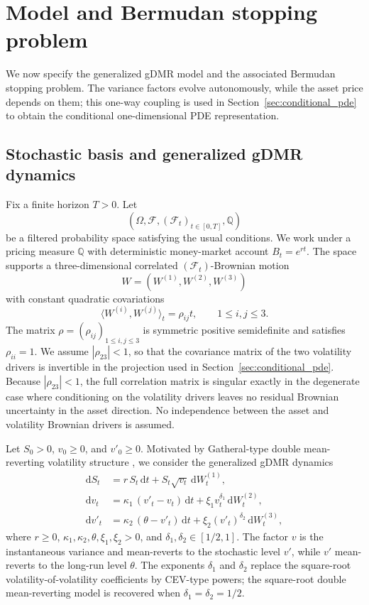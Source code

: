 \documentclass[pdflatex,sn-mathphys-num]{sn-jnl}
\theoremstyle{thmstyleone}%
\theoremstyle{thmstylethree}%
\theoremstyle{thmstyletwo}%
\newcommand{\dd}{\mathrm d}
\newcommand{\Q}{\mathbb Q}
\newcommand{\F}{\mathcal F}
\begin{document}
\section{Model and Bermudan stopping problem}\label{sec:model}

We now specify the generalized gDMR model and the associated Bermudan stopping
problem. The variance factors evolve autonomously, while the asset price depends
on them; this one-way coupling is used in Section~\ref{sec:conditional_pde} to
obtain the conditional one-dimensional PDE representation.

\subsection{Stochastic basis and generalized gDMR dynamics}

Fix a finite horizon $T>0$. Let
\[
(\Omega,\F,(\F_t)_{t\in[0,T]},\Q)
\]
be a filtered probability space satisfying the usual conditions. We work under a
pricing measure $\Q$ with deterministic money-market account $B_t=e^{rt}$. The
space supports a three-dimensional correlated $(\F_t)$-Brownian motion
\[
W=(W^{(1)},W^{(2)},W^{(3)})
\]
with constant quadratic covariations
\[
\langle W^{(i)},W^{(j)}\rangle_t=\rho_{ij}t,\qquad 1\le i,j\le 3.
\]
The matrix $\rho=(\rho_{ij})_{1\le i,j\le 3}$ is symmetric positive
semidefinite and satisfies $\rho_{ii}=1$. We assume $|\rho_{23}|<1$, so that
the covariance matrix of the two volatility drivers is invertible in the
projection used in Section~\ref{sec:conditional_pde}. Because $|\rho_{23}|<1$,
the full correlation matrix is singular exactly in the degenerate case where
conditioning on the volatility drivers leaves no residual Brownian uncertainty
in the asset direction. No independence between the asset and volatility Brownian
drivers is assumed.

Let $S_0>0$, $v_0\ge0$, and $v'_0\ge0$. Motivated by Gatheral-type double mean-reverting volatility structure \citep{gatheral2006volsurface,bayer2013fast}, we consider the generalized gDMR dynamics
\begin{equation}\label{eq:gdmr}
\begin{aligned}
\dd S_t &= r\,S_t\,\dd t + S_t\sqrt{v_t}\,\dd W^{(1)}_t,\\
\dd v_t &= \kappa_1\,(v'_t - v_t)\,\dd t + \xi_1 v_t^{\delta_1}\,\dd W^{(2)}_t,\\
\dd v'_t &= \kappa_2\,(\theta - v'_t)\,\dd t + \xi_2 (v'_t)^{\delta_2}\,\dd W^{(3)}_t,
\end{aligned}
\end{equation}
where $r\ge0$, $\kappa_1,\kappa_2,\theta,\xi_1,\xi_2>0$, and
$\delta_1,\delta_2\in[1/2,1]$. The factor $v$ is the instantaneous variance and
mean-reverts to the stochastic level $v'$, while $v'$ mean-reverts to the
long-run level $\theta$. The exponents $\delta_1$ and $\delta_2$ replace the
square-root volatility-of-volatility coefficients by CEV-type powers; the
square-root double mean-reverting model is recovered when
$\delta_1=\delta_2=1/2$.
\end{document}
